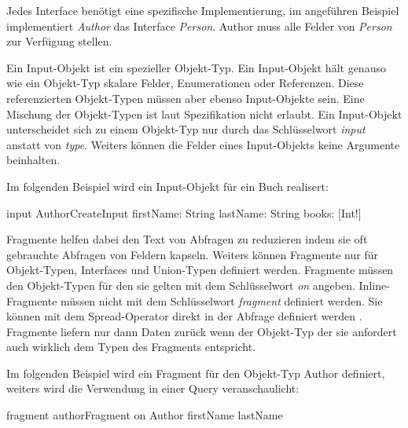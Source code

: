 Jedes Interface benötigt eine spezifische Implementierung, im angeführen Beispiel implementiert \textit{Author} das Interface \textit{Person}.
Author muss alle Felder von \textit{Person} zur Verfügung stellen.

Ein Input-Objekt ist ein spezieller Objekt-Typ. Ein Input-Objekt hält genauso wie ein Objekt-Typ skalare Felder, Enumerationen oder Referenzen.
Diese referenzierten Objekt-Typen müssen aber ebenso Input-Objekte sein.
Eine Mischung der Objekt-Typen ist laut Spezifikation nicht erlaubt.
Ein Input-Objekt unterscheidet sich zu einem Objekt-Typ nur durch das Schlüsselwort \textit{input} anstatt von \textit{type}.
Weiters können die Felder eines Input-Objekts keine Argumente beinhalten.
\newline


Im folgenden Beispiel wird ein Input-Objekt für ein Buch realisert:
\begin{JsCode}
input AuthorCreateInput {
  firstName: String
  lastName: String
  books: [Int!]
}
\end{JsCode}


Fragmente helfen dabei den Text von Abfragen zu reduzieren indem sie oft gebrauchte Abfragen von Feldern kapseln.
Weiters können Fragmente nur für Objekt-Typen, Interfaces und Union-Typen definiert werden.
Fragmente müssen den Objekt-Typen für den sie gelten mit dem Schlüsselwort  \textit{on} angeben.
Inline-Fragmente müssen nicht mit dem Schlüsselwort \textit{fragment} definiert werden.
Sie können mit dem Spread-Operator direkt in der Abfrage definiert werden \cite[Abs. 2.8 -  2.8.1]{graphqlOnline}.
Fragmente liefern nur dann Daten zurück wenn der Objekt-Typ der sie anfordert auch wirklich dem Typen des Fragments entspricht.

Im folgenden Beispiel wird ein Fragment für den Objekt-Typ Author definiert, weiters wird die Verwendung in einer Query veranschaulicht:
\begin{JsCode}
fragment authorFragment on Author {
    firstName
    lastName
}

\end{JsCode}


